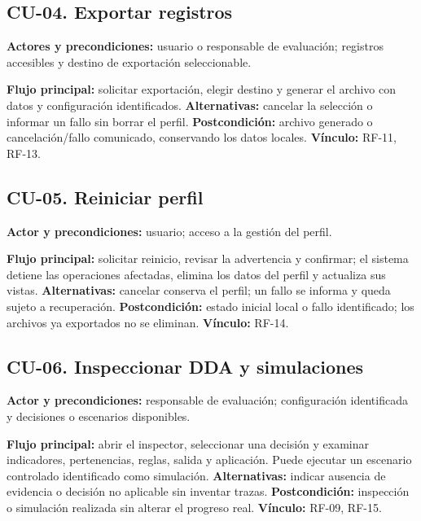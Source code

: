 \subsection{CU-04. Exportar registros}
\textbf{Actores y precondiciones:} usuario o responsable de evaluación; registros
accesibles y destino de exportación seleccionable.

\textbf{Flujo principal:} solicitar exportación, elegir destino y generar el
archivo con datos y configuración identificados. \textbf{Alternativas:} cancelar
la selección o informar un fallo sin borrar el perfil. \textbf{Postcondición:}
archivo generado o cancelación/fallo comunicado, conservando los datos locales.
\textbf{Vínculo:} RF-11, RF-13.

\subsection{CU-05. Reiniciar perfil}
\textbf{Actor y precondiciones:} usuario; acceso a la gestión del perfil.

\textbf{Flujo principal:} solicitar reinicio, revisar la advertencia y confirmar;
el sistema detiene las operaciones afectadas, elimina los datos del perfil y
actualiza sus vistas. \textbf{Alternativas:} cancelar conserva el perfil; un fallo
se informa y queda sujeto a recuperación. \textbf{Postcondición:} estado inicial
local o fallo identificado; los archivos ya exportados no se eliminan.
\textbf{Vínculo:} RF-14.

\subsection{CU-06. Inspeccionar DDA y simulaciones}
\textbf{Actor y precondiciones:} responsable de evaluación; configuración
identificada y decisiones o escenarios disponibles.

\textbf{Flujo principal:} abrir el inspector, seleccionar una decisión y examinar
indicadores, pertenencias, reglas, salida y aplicación. Puede ejecutar un escenario
controlado identificado como simulación. \textbf{Alternativas:} indicar ausencia
de evidencia o decisión no aplicable sin inventar trazas. \textbf{Postcondición:}
inspección o simulación realizada sin alterar el progreso real.
\textbf{Vínculo:} RF-09, RF-15.
